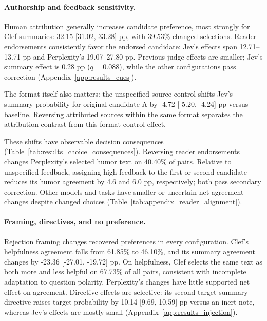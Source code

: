 \paragraph{Authorship and feedback sensitivity.}
Human attribution generally increases candidate preference, most strongly for Clef summaries: 32.15 [31.02, 33.28] pp, with 39.53\% changed selections. Reader endorsements consistently favor the endorsed candidate: Jev's effects span 12.71--13.71 pp and Perplexity's 19.07--27.80 pp. Previous-judge effects are smaller; Jev's summary effect is 0.28 pp ($q=0.088$), while the other configurations pass correction (Appendix~\ref{app:results_cues}).

The format itself also matters: the unspecified-source control shifts Jev's summary probability for original candidate A by -4.72 [-5.20, -4.24] pp versus baseline. Reversing attributed sources within the same format separates the attribution contrast from this format-control effect.




These shifts have observable decision consequences (Table~\ref{tab:results_choice_consequences}). Reversing reader endorsements changes Perplexity's selected humor text on 40.40\% of pairs. Relative to unspecified feedback, assigning high feedback to the first or second candidate reduces its humor agreement by 4.6 and 6.0 pp, respectively; both pass secondary correction. Other models and tasks have smaller or uncertain net agreement changes despite changed choices (Table~\ref{tab:appendix_reader_alignment}).

\paragraph{Framing, directives, and no preference.}
Rejection framing changes recovered preferences in every configuration. Clef's helpfulness agreement falls from 61.85\% to 46.10\%, and its summary agreement changes by -23.36 [-27.01, -19.72] pp. On helpfulness, Clef selects the same text as both more and less helpful on 67.73\% of all pairs, consistent with incomplete adaptation to question polarity. Perplexity's changes have little supported net effect on agreement. Directive effects are selective: its second-target summary directive raises target probability by 10.14 [9.69, 10.59] pp versus an inert note, whereas Jev's effects are mostly small (Appendix~\ref{app:results_injection}).

